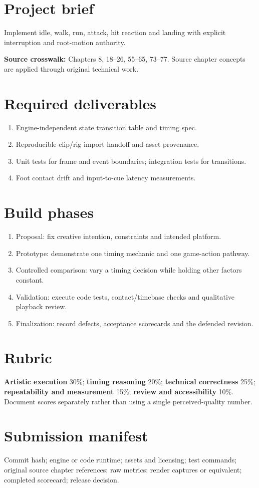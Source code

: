 \documentclass[10pt,letterpaper]{article}
\begin{document}
\makedoctitle
\makedocsummary
\tableofcontents\clearpage
\section{Project brief}
Implement idle, walk, run, attack, hit reaction and landing with explicit interruption and root-motion authority.\par\textbf{Source crosswalk:} Chapters 8, 18--26, 55--65, 73--77. Source chapter concepts are applied through original technical work.
\section{Required deliverables}
\begin{enumerate}
\item Engine-independent state transition table and timing spec.
\item Reproducible clip/rig import handoff and asset provenance.
\item Unit tests for frame and event boundaries; integration tests for transitions.
\item Foot contact drift and input-to-cue latency measurements.
\end{enumerate}
\section{Build phases}
\begin{enumerate}
\item Proposal: fix creative intention, constraints and intended platform.
\item Prototype: demonstrate one timing mechanic and one game-action pathway.
\item Controlled comparison: vary a timing decision while holding other factors constant.
\item Validation: execute code tests, contact/timebase checks and qualitative playback review.
\item Finalization: record defects, acceptance scorecards and the defended revision.
\end{enumerate}
\section{Rubric}
\textbf{Artistic execution} 30\%; \textbf{timing reasoning} 20\%; \textbf{technical correctness} 25\%; \textbf{repeatability and measurement} 15\%; \textbf{review and accessibility} 10\%. Document scores separately rather than using a single perceived-quality number.
\section{Submission manifest}
Commit hash; engine or code runtime; assets and licensing; test commands; original source chapter references; raw metrics; render captures or equivalent; completed scorecard; release decision.
\end{document}
